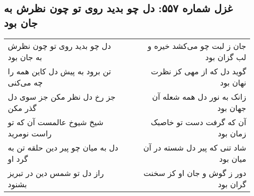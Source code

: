 \begin{center}
\section*{غزل شماره ۵۵۷: دل چو بدید روی تو چون نظرش به جان بود}
\label{sec:0557}
\begin{longtable}{l p{0.5cm} r}
دل چو بدید روی تو چون نظرش به جان بود
&&
جان ز لبت چو می‌کشد خیره و لب گزان بود
\\
تن برود به پیش دل کاین همه را چه می‌کنی
&&
گوید دل که از مهی کز نظرت نهان بود
\\
جز رخ دل نظر مکن جز سوی دل گذر مکن
&&
زانک به نور دل همه شعله آن جهان بود
\\
شیخ شیوخ عالمست آن که تو راست نومرید
&&
آن که گرفت دست تو خاصبک زمان بود
\\
دل به میان چو پیر دین حلقه تن به گرد او
&&
شاد تنی که پیر دل شسته در آن میان بود
\\
راز دل تو شمس دین در تبریز بشنود
&&
دور ز گوش و جان او کز سخنت گران بود
\\
\end{longtable}
\end{center}

